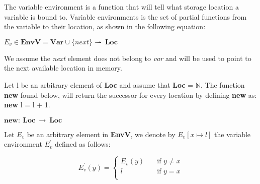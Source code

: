 	The variable environment is a function that will tell what storage location a variable is bound to. Variable environments is the set of partial functions from the variable to their location, as shown in the following equation:
	
	
	
	
	
	\begin{math} 		
		E_v \in \boldsymbol{EnvV} = \boldsymbol{Var} \cup \{ next \} \rightharpoonup \ \boldsymbol{Loc}		
	\end{math}
	
	
	
	
	
	We assume the \textit{next} element does not belong to \textit{var} and will be used to point to the next available location in memory.
	
	
	Let l be an arbitrary element of \textbf{Loc} and assume that \textbf{Loc} = \begin{math} \mathbb{N}. \end{math} The function \textbf{new} found below, will return the successor for every location by defining \textbf{new} as: \textbf{new} l = l + 1.
	
	
	
	
	
	\begin{math}		
		\boldsymbol{new} : \ \boldsymbol{Loc} \ \rightarrow \ \boldsymbol{Loc}		
	\end{math}
	
	
	
	
	
	Let \begin{math}E_v\end{math} be an arbitrary element in \textbf{EnvV}, we denote by \begin{math} E_v[x \mapsto l] \end{math} the variable environment \begin{math}E_v^{'} \end{math} defined as follows:
	
	
	
	
	
	\[ E^{'}_v(y) =	
	\begin{cases}
	E_v(y) & \quad \text{if } y \not= x\\
	l & \quad \text{if } y = x\\	
	\end{cases}	
	\]
	
	
	
	
	
